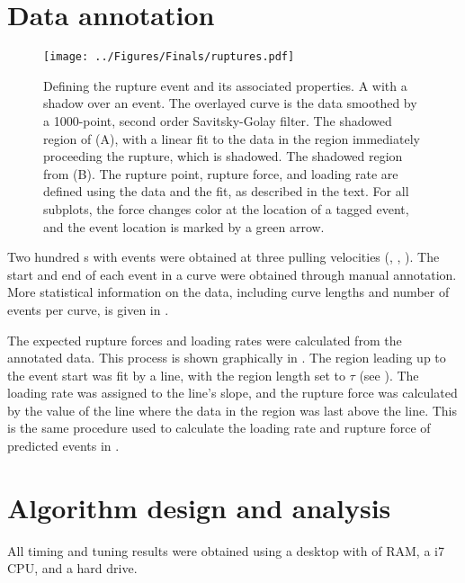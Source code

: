 \section{Data annotation}


\begin{figure}[htpb]
\caption[Definition of rupture force and loading rate]{ Defining the rupture event and its associated properties.  A \fec{} with a shadow over an event. The overlayed curve is the data smoothed by a 1000-point, second order Savitsky-Golay filter.  The shadowed region of (A), with a linear fit to the data in the region immediately proceeding the rupture, which is shadowed.  The shadowed region from (B). The rupture point, rupture force, and loading rate are defined using the data and the fit, as described in the text. For all subplots, the force changes color at the location of a tagged event, and the event location is marked by a green arrow. }
\centering
\texttt{[image: ../Figures/Finals/ruptures.pdf]}%
\end{figure}

Two hundred \fec{}s with events were obtained at three pulling velocities (, , ). The start and end of each event in a curve were obtained through manual annotation. More statistical information on the data, including curve lengths and number of events per curve, is given in .

The expected rupture forces and loading rates were calculated from the annotated data. This process is shown graphically in . The region leading up to the event start was fit by a line, with the region length set to $\tau$ (see ). The loading rate was assigned to the line's slope, and the rupture force was calculated by the value of the line where the data in the region was last above the line. This is the same procedure used to calculate the loading rate and rupture force of predicted events in . 



\section{Algorithm design and analysis}

All timing and tuning results were obtained using a desktop with  of RAM, a  i7 CPU, and a  hard drive. 

